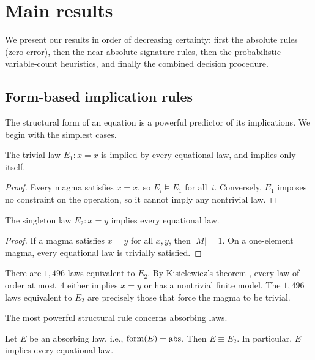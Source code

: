 \section{Main results}\label{sec:main}

We present our results in order of decreasing certainty: first the absolute
rules (zero error), then the near-absolute signature rules, then the
probabilistic variable-count heuristics, and finally the combined decision
procedure.

\subsection{Form-based implication rules}

The structural form of an equation is a powerful predictor of its implications.
We begin with the simplest cases.

\begin{proposition}\label{prop:trivial}
The trivial law $E_1 \colon x = x$ is implied by every equational law, and
implies only itself.
\end{proposition}

\begin{proof}
Every magma satisfies $x = x$, so $E_i \models E_1$ for all~$i$.  Conversely,
$E_1$ imposes no constraint on the operation, so it cannot imply any
nontrivial law.
\end{proof}

\begin{proposition}\label{prop:singleton}
The singleton law $E_2 \colon x = y$ implies every equational law.
\end{proposition}

\begin{proof}
If a magma satisfies $x = y$ for all $x, y$, then $|M| = 1$.  On a
one-element magma, every equational law is trivially satisfied.
\end{proof}

\begin{remark}\label{rem:E2-equiv}
There are $1{,}496$ laws equivalent to $E_2$.  By Kisielewicz's theorem
\cite{Kisielewicz1994}, every law of order at most~$4$ either implies $x = y$
or has a nontrivial finite model.  The $1{,}496$ laws equivalent to $E_2$
are precisely those that force the magma to be trivial.
\end{remark}

The most powerful structural rule concerns absorbing laws.

\begin{theorem}\label{thm:absorbing}
Let $E$ be an absorbing law, i.e., $\mathrm{form}(E) = \text{abs}$.  Then
$E \equiv E_2$.  In particular, $E$ implies every equational law.
\end{theorem}

